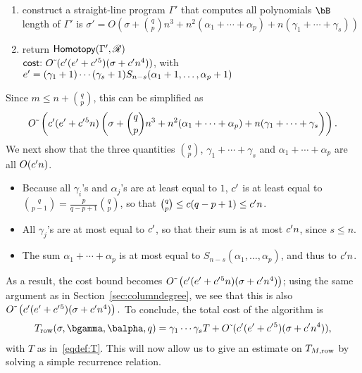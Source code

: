 \documentclass[12pt]{article}
\begin{document}
\begin{algorithm}[!t]
\begin{enumerate}
\item construct a straight-line program $\Gamma'$ that computes all polynomials $\bB$\\
  length of $\Gamma'$ is $\sigma'=O(\sigma + {q \choose p} n^3 + n^2
(\alpha_1+\cdots+\alpha_p) + n(\gamma_1 + \cdots + \gamma_s))$

\item return $\mathsf{Homotopy}(\Gamma',\mathscr{R})$\\
 $\text{\sf{cost:~}} {O}{\,\tilde{ }\,}( {c'}{}({e'}{}+{c'}{}^5 )(\sigma + {c'}{} n^4) )$, 
with ${e'}{}=(\gamma_1+1) \cdots (\gamma_s+1) S_{n-s}(\alpha_1+1,\dots,\alpha_p+1)$
\end{enumerate}
\label{RowHom}
\end{algorithm}

Since $m \le n + {q \choose p}$, this can be simplified as
$${O}{\,\tilde{ }\,}\left ({c'}{}({e'}{}+{c'}{}^5 n)\left(\sigma + {q \choose p} n^3 + n^2
(\alpha_1+\cdots+\alpha_p) + n(\gamma_1 + \cdots +
\gamma_s\right)\right).$$ We next show that the three quantities $ {q \choose p}$,
$\gamma_1 + \cdots + \gamma_s$ and $\alpha_1+\cdots+\alpha_p$ are all
$O({c'}{} n)$.
\begin{itemize}
\item Because all $\gamma_i$'s and $\alpha_j$'s are at least equal to $1$,
${c'}{}$ is at least equal to $ {q \choose {p-1}}= \frac p{q-p+1}{q
  \choose p}$, so that ${q \choose p} \le c(q-p+1) \le {c'}{} n$.
\item All $\gamma_j$'s are at most equal to ${c'}{}$, so that their sum is at most
  ${c'}{} n$, since $s \le n$.
\item The sum $\alpha_1+\cdots+\alpha_p$ is at most equal to
  $S_{n-s}(\alpha_1,\dots,\alpha_p)$, and thus to ${c'}{} n$.
\end{itemize}
As a result, the cost bound becomes
${O}{\,\tilde{ }\,}\left ({c'}{}({e'}{}+{c'}{}^5 n)(\sigma + {c'}{} n^4)\right)$;  using the 
same argument as in  Section~\ref{sec:columndegree}, 
we see that this is also
${O}{\,\tilde{ }\,}\left ({c'}{}({e'}{}+{c'}{}^5 )(\sigma + {c'}{} n^4)\right).$ To conclude, the 
total cost of the algorithm is
\begin{align}\label{eq:recT}
T_{\rm row}(\sigma,\bgamma,\balpha,q)= \gamma_1 \cdots\gamma_s T + \softO( \rc(\re+\rc^5 )(\sigma + \rc n^4)),  
\end{align}
with $T$ as in~\eqref{eqdef:T}. This will now allow us to
give an estimate on $T_{M,{\rm row}}$ by solving a simple recurrence
relation.
\end{document}

